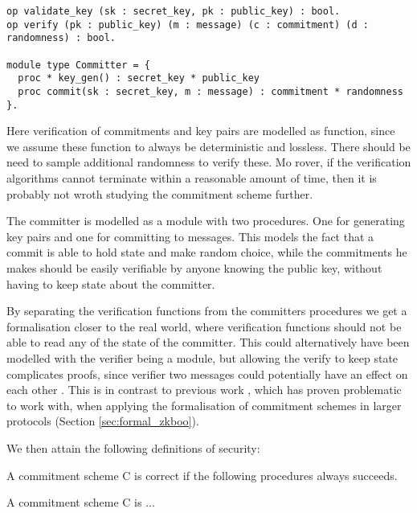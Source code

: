 \begin{lstlisting}[float,label=lst:commitment-procedures,caption= Key-Based commitment specification]
op validate_key (sk : secret_key, pk : public_key) : bool.
op verify (pk : public_key) (m : message) (c : commitment) (d : randomness) : bool.

module type Committer = {
  proc * key_gen() : secret_key * public_key
  proc commit(sk : secret_key, m : message) : commitment * randomness
}.
\end{lstlisting}
Here verification of commitments and key pairs are modelled as function, since
we assume these function to always be deterministic and lossless. There should
be need to sample additional randomness to verify these. Mo rover, if the
verification algorithms cannot terminate within a reasonable amount of time,
then it is probably not wroth studying the commitment scheme further.

The committer is modelled as a module with two procedures. One for generating
key pairs and one for committing to messages. This models the fact that a commit
is able to hold state and make random choice, while the commitments he makes
should be easily verifiable by anyone knowing the public key, without having to
keep state about the committer.

By separating the verification functions from the committers procedures we get a
formalisation closer to the real world, where verification functions should not
be able to read any of the state of the committer. This could alternatively have
been modelled with the verifier being a module, but allowing the verify to keep
state complicates proofs, since verifier two messages could potentially have an
effect on each other .
This is in contrast to previous work \cite{DBLP:journals/corr/MetereD17}, which
has proven problematic to work with, when applying the formalisation of
commitment schemes in larger protocols (Section \ref{sec:formal_zkboo}).

We then attain the following definitions of security:

\begin{definition}[Correctness]
  \label{def:commitment:correctness}
  A commitment scheme C is correct if the following procedures always succeeds.
\end{definition}

\begin{definition}[Hiding]
  A commitment scheme C is ...
\end{definition}

